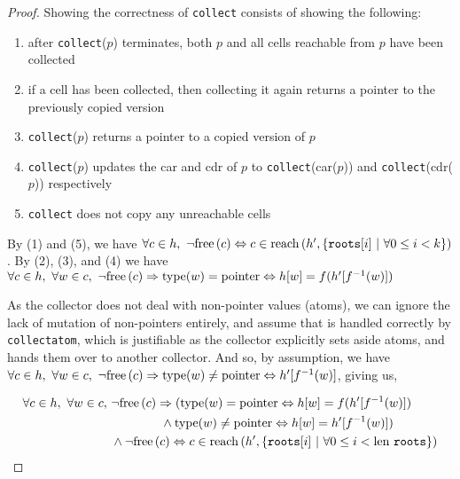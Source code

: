 \begin{proof}
  Showing the correctness of \texttt{collect} consists of showing the
  following:

  \begin{enumerate}
  \item after \texttt{collect}($p$) terminates, both $p$ and all cells
    reachable from $p$ have been collected

  \item if a cell has been collected, then collecting it again returns
    a pointer to the previously copied version

  \item \texttt{collect}($p$) returns a pointer to a copied version of
    $p$

  \item \texttt{collect}($p$) updates the car and cdr of $p$ to
    \texttt{collect}(car($p$)) and \texttt{collect}(cdr($p$))
    respectively

  \item \texttt{collect} does not copy any unreachable cells
  \end{enumerate}

  By (1) and (5), we have $\forall c \in h,\ \lnot\free{c} \iff c \in
  \reach{h'}{\{\mathtt{roots}[i]~|~\forall 0 \leq i < k\}}$. By (2),
  (3), and (4) we have $\forall c \in h,\ \forall w \in c,\ \lnot\mathrm{free}\left(c\right)
  \Rightarrow \mathrm{type}(w) = \mathrm{pointer} \Leftrightarrow h[w] =
  f(h'[f^{-1}(w)])$

  As the collector does not deal with non-pointer values (atoms), we
  can ignore the lack of mutation of non-pointers entirely, and assume
  that is handled correctly by \texttt{collectatom}, which is
  justifiable as the collector explicitly sets aside atoms, and hands
  them over to another collector. And so, by assumption, we have
  $\forall c \in h,\ \forall w \in c,\ \lnot\mathrm{free}\left(c\right) \Rightarrow
  \mathrm{type}(w) \neq \mathrm{pointer} \Leftrightarrow h'[f^{-1}(w)]$, giving
  us,

  \begin{align*}
    \forall c \in h,\ \forall w \in c,\ &\lnot\mathrm{free}\left(c\right) \Rightarrow
    (\mathrm{type}(w) = \mathrm{pointer} \Leftrightarrow h[w] = f(h'[f^{-1}(w)])\\
    &\quad\quad\quad\quad \land \mathrm{type}(w) \neq \mathrm{pointer}
    \Leftrightarrow h[w] = h'[f^{-1}(w)])\\
    &\land \lnot\mathrm{free}\left(c\right) \Leftrightarrow c \in \mathrm{reach}\left(h', \{\mathtt{roots}[i]~|~\forall
      0 \leq i < \mathrm{len}~\mathtt{roots}\}\right)
  \end{align*}
\end{proof}

